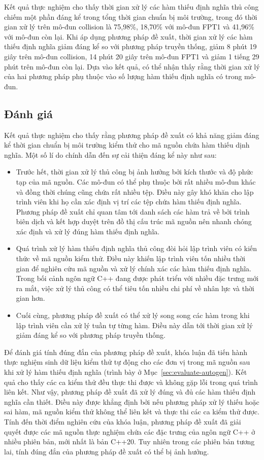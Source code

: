 Kết quả thực nghiệm cho thấy thời gian xử lý các hàm thiếu định nghĩa thủ công chiếm một phần đáng kể trong tổng thời gian chuẩn bị môi trường, trong đó thời gian xử lý trên mô-đun collision là 75,98\%, 18,70\% với mô-đun FPT1 và 41,96\% với mô-đun còn lại. Khi áp dụng phương pháp đề xuất, thời gian xử lý các hàm thiếu định nghĩa giảm đáng kể so với phương pháp truyền thống, giảm 8 phút 19 giây trên mô-đun collision, 14 phút 20 giây trên mô-đun FPT1 và giảm 1 tiếng 29 phút trên mô-đun còn lại. Dựa vào kết quả, có thể nhận thấy rằng thời gian xử lý của hai phương pháp phụ thuộc vào số lượng hàm thiếu định nghĩa có trong mô-đun.

\subsection{Đánh giá}
Kết quả thực nghiệm cho thấy rằng phương pháp đề xuất có khả năng giảm đáng kể thời gian chuẩn bị môi trường kiểm thử cho mã nguồn chứa hàm thiếu dịnh nghĩa. Một số lí do chính dẫn đến sự cải thiện đáng kể này như sau:
\begin{itemize}
    \item Trước hết, thời gian xử lý thủ công bị ảnh hưởng bởi kích thước và độ phức tạp của mã nguồn. Các mô-đun có thể phụ thuộc bởi rất nhiều mô-đun khác và đồng thời chúng cũng chứa rất nhiều tệp. Điều này gây khó khăn cho lập trình viên khi họ cần xác định vị trí các tệp chứa hàm thiếu định nghĩa. Phương pháp đề xuất chỉ quan tâm tới danh sách các hàm trả về bởi trình biên dịch và kết hợp duyệt trên đồ thị cấu trúc mã nguồn nên nhanh chóng xác định và xử lý đúng hàm thiếu định nghĩa.
    \item Quá trình xử lý hàm thiếu định nghĩa thủ công đòi hỏi lập trình viên có kiến thức về mã nguồn kiểm thử. Điều này khiến lập trình viên tốn nhiều thời gian để nghiên cứu mã nguồn và xử lý chính xác các hàm thiếu định nghĩa. Trong bối cảnh ngôn ngữ C++ đang được phát triển với nhiều đặc trưng mới ra mắt, việc xử lý thủ công có thể tiêu tốn nhiều chi phí về nhân lực và thời gian hơn.
    \item Cuối cùng, phương pháp đề xuất có thể xử lý song song các hàm trong khi lập trình viên cần xử lý tuần tự từng hàm. Điều này dẫn tới thời gian xử lý giảm đáng kể so với phương pháp truyền thống.
\end{itemize}

Để đánh giá tính đúng đắn của phương pháp đề xuất, khóa luận đã tiến hành thực nghiệm sinh dữ liệu kiểm thử tự động cho các đơn vị trong mã nguồn sau khi xử lý hàm thiếu định nghĩa (trình bày ở Mục~\ref{sec:evaluate-autogen}). Kết quả cho thấy các ca kiểm thử đều thực thi được và không gặp lỗi trong quá trình liên kết. Như vậy, phương pháp đề xuất đã xử lý đúng và đủ các hàm thiếu định nghĩa cần thiết. Điều này được khẳng định bởi nếu phương pháp xử lý thiếu hoặc sai hàm, mã nguồn kiểm thử không thể liên kết và thực thi các ca kiểm thử được. Tính đến thời điểm nghiên cứu của khóa luận, phương pháp đề xuất đã giải quyết được các mã nguồn thực nghiệm chứa các đặc trưng của ngôn ngữ C++ ở nhiều phiên bản, mới nhất là bản C++20. Tuy nhiên trong các phiên bản tương lai, tính đúng đắn của phương pháp đề xuất có thể bị ảnh hưởng.

